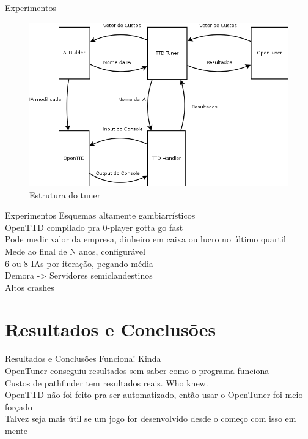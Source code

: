 \documentclass[10pt]{beamer}
\begin{document}
\begin{frame}{Experimentos}
	\begin{figure}
\centering
\includegraphics[width=1\linewidth]{Diagrama1}
\caption{Estrutura do tuner}
\label{fig:Diagrama1}
\end{figure}

\end{frame}
	
\begin{frame}{Experimentos}
	Esquemas altamente gambiarrísticos \pause\\
	OpenTTD compilado pra 0-player gotta go fast\pause\\
	Pode medir valor da empresa, dinheiro em caixa ou lucro no último quartil\pause\\
	Mede ao final de N anos, configurável\pause\\
	6 ou 8 IAs por iteração, pegando média\pause\\
	Demora \pause -> Servidores semiclandestinos\pause\\
	Altos crashes
\end{frame}

\section{Resultados e Conclusões}

\begin{frame}{Resultados e Conclusões}
	Funciona! \pause Kinda\pause\\
	OpenTuner conseguiu resultados sem saber como o programa funciona\pause \\
	Custos de pathfinder tem resultados reais. Who knew.\pause\\
	OpenTTD não foi feito pra ser automatizado, então usar o OpenTuner foi meio forçado\pause\\
	Talvez seja mais útil se um jogo for desenvolvido desde o começo com isso em mente
\end{frame}
\end{document}
